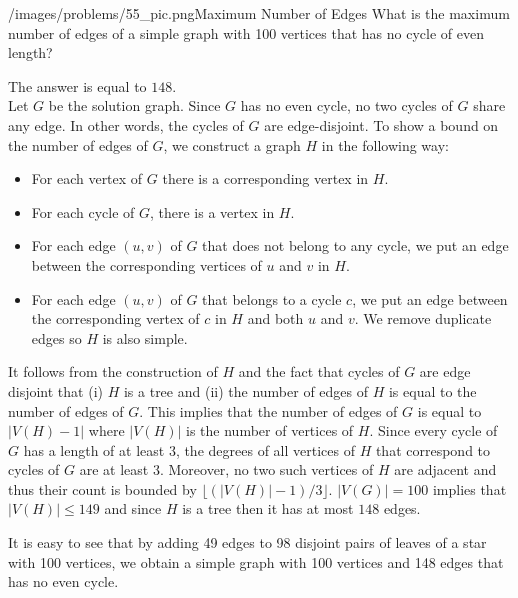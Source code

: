 \begin{problem}{/images/problems/55_pic.png}{Maximum Number of Edges}  What is the maximum number of edges of a simple graph with 100 vertices that has no cycle of even length?
\end{problem}

\begin{solution}
	The answer is equal to $148$.\\[0.2cm]
	
	Let $G$ be the solution graph. Since $G$ has no even cycle, no two cycles of $G$  share any edge. In other words, the cycles of $G$ are edge-disjoint. To show a bound on the number of edges of $G$, we construct a graph $H$ in the following way:
	\begin{itemize}
		\item For each vertex of $G$ there is a corresponding vertex in $H$.
		\item For each cycle of $G$, there is a vertex in $H$.
		\item For each edge $(u,v)$ of $G$ that does not belong to any cycle, we put an edge between the corresponding vertices of $u$ and $v$ in $H$.
		\item For each edge $(u,v)$ of $G$ that belongs to a cycle $c$, we put an edge between the corresponding vertex of $c$ in $H$ and both $u$ and $v$. We remove duplicate edges so $H$ is also simple.
	\end{itemize}

It follows from the construction of $H$ and the fact that cycles of $G$ are edge disjoint that (i) $H$ is a tree and (ii) the number of edges of $H$ is equal to the number of edges of $G$. This implies that the number of edges of $G$ is equal to $|V(H)-1|$ where $|V(H)|$ is the number of vertices of $H$. Since every cycle of $G$ has a length of at least $3$, the degrees of all vertices of $H$ that correspond to cycles of $G$ are at least $3$. Moreover, no two such vertices of $H$ are adjacent and thus their count is bounded by $\lfloor (|V(H)|-1)/3 \rfloor$. $|V(G)| =100$ implies that $|V(H)| \leq 149$ and since $H$ is a tree then it has at most $148$ edges. 

It is easy to see that by adding 49 edges to 98 disjoint pairs of leaves of a star with 100 vertices, we obtain a simple graph with 100 vertices and 148 edges that has no even cycle.
\end{solution}
